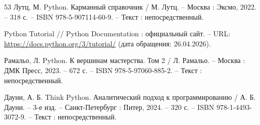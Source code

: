 \begin{thebibliography}{53}
	Лутц, М. Python. Карманный справочник / М. Лутц. – Москва : Эксмо, 2022. – 318 с. – ISBN 978-5-907114-60-9. – Текст : непосредственный.
	
	Python Tutorial // Python Documentation : официальный сайт. – URL: \url{https://docs.python.org/3/tutorial/} (дата обращения: 26.04.2026).
	
	Рамальо, Л. Python. К вершинам мастерства. Том 2 / Л. Рамальо. – Москва : ДМК Пресс, 2023. – 672 с. – ISBN 978-5-97060-885-2. – Текст : непосредственный.
	
	Дауни, А. Б. Think Python. Аналитический подход к программированию / А. Б. Дауни. – 3-е изд. – Санкт-Петербург : Питер, 2024. – 320 с. – ISBN 978-1-4493-3072-9. – Текст : непосредственный.
	
\end{thebibliography}